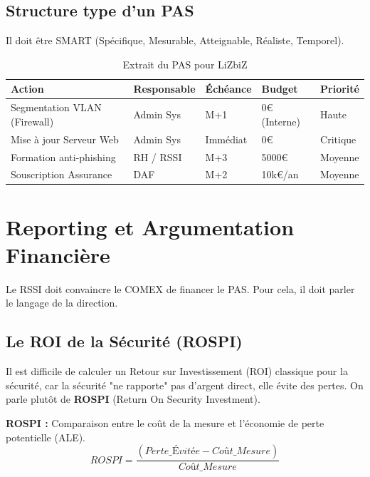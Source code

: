 \subsection{Structure type d'un PAS}

Il doit être SMART (Spécifique, Mesurable, Atteignable, Réaliste, Temporel).

\begin{table}[htbp]
\centering
\small
\begin{tabular}{p{4cm}p{2.5cm}p{2.5cm}p{2cm}p{2cm}}
    \toprule
    \textbf{Action} & \textbf{Responsable} & \textbf{Échéance} & \textbf{Budget} & \textbf{Priorité} \\
    \midrule
    Segmentation VLAN (Firewall) & Admin Sys & M+1 & 0€ (Interne) & Haute \\
    Mise à jour Serveur Web & Admin Sys & Immédiat & 0€ & Critique \\
    Formation anti-phishing & RH / RSSI & M+3 & 5000€ & Moyenne \\
    Souscription Assurance & DAF & M+2 & 10k€/an & Moyenne \\
    \bottomrule
\end{tabular}
\caption{Extrait du PAS pour LiZbiZ}
\end{table}

\section{Reporting et Argumentation Financière}

Le RSSI doit convaincre le COMEX de financer le PAS. Pour cela, il doit parler le langage de la direction.

\subsection{Le ROI de la Sécurité (ROSPI)}

Il est difficile de calculer un Retour sur Investissement (ROI) classique pour la sécurité, car la sécurité "ne rapporte" pas d'argent direct, elle évite des pertes. On parle plutôt de \textbf{ROSPI} (Return On Security Investment).

\begin{boxdef}
\textbf{ROSPI :} Comparaison entre le coût de la mesure et l'économie de perte potentielle (ALE).
\[ ROSPI = \frac{(Perte\_Évitée - Coût\_Mesure)}{Coût\_Mesure} \]
\end{boxdef}

